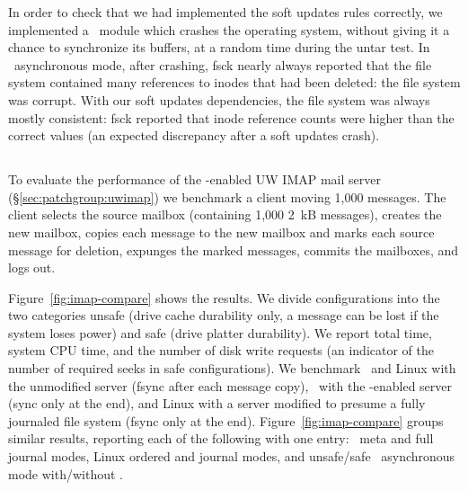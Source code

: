 In order to check that we had implemented the soft updates rules correctly, we
implemented a \Kudos\ module which crashes the operating system, without
giving it a chance to synchronize its buffers, at a random time during the
untar test.
%
In \Kudos\ asynchronous mode, after crashing, fsck nearly always reported that
the file system contained many references to inodes that had been deleted: the
file system was corrupt.
%
With our soft updates dependencies, the file system was always mostly
consistent: fsck reported that inode reference counts were higher than the
correct values (an expected discrepancy after a soft updates crash).

\subsection {\Patchgroups}
\label{sec:evaluation:uwimap}


To evaluate the performance of the \patchgroup-enabled UW IMAP mail
server (\S\ref{sec:patchgroup:uwimap}) we benchmark a client moving
1,000 messages. The client selects the source mailbox (containing
1,000 2~kB messages), creates the new mailbox, copies each message to
the new mailbox and marks each source message for deletion, expunges
the marked messages, commits the mailboxes, and logs out.

Figure~\ref{fig:imap-compare} shows the results.
%
We divide configurations into the two categories unsafe (drive cache
durability only, a message can be lost if the system loses power) and safe
(drive platter durability).
%
We report total time, system CPU time, and the number of disk write
requests (an indicator of the number of required seeks in safe
configurations).
%
We benchmark
%
\Kudos\ and Linux with the unmodified server (fsync after each message
copy),
%
\Kudos\ with the \patchgroup-enabled server (sync only at the end),
%
and Linux with a server modified to presume a fully journaled file
system (fsync only at the end).
%
Figure~\ref{fig:imap-compare} groups similar results, reporting each
of the following with one entry:
%
\Kudos\ meta and full journal modes,
%
Linux ordered and journal modes,
%
and unsafe/safe \Kudos\ asynchronous mode with/without \patchgroups.

